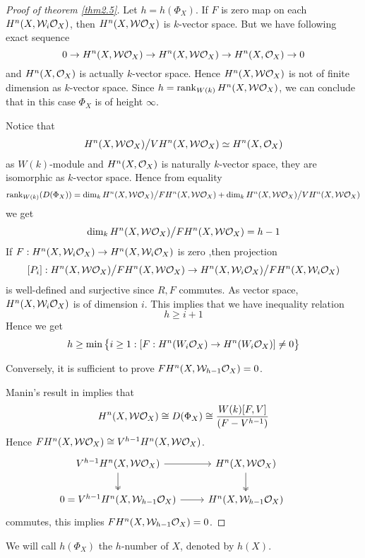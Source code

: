 \documentclass[11pt,a4paper]{scmsnotes}
\begin{document}
\begin{proof}[Proof of theorem \ref{thm2.5}]
	Let $h=h(\Phi_X)$. If $F$ is zero map on each $H^n(X,\mathcal{W}_{i} \mathcal{O}_{X})$, then $H^n(X,\mathcal{W}\mathcal{O}_{X})$ is $k$-vector space. But we have following exact sequence
	\[
	0 \to H^n(X,\mathcal{W}\mathcal{O}_{X}) \to H^n(X,\mathcal{W}\mathcal{O}_{X}) \to H^n(X,\mathcal{O}_{X}) \to 0
	\]
	and $H^n(X,\mathcal{O}_{X})$ is actually $k$-vector space. Hence $H^n(X,\mathcal{W} \mathcal{O}_{X})$ is not of finite dimension as $k$-vector space. Since $h= \operatorname{rank} _{W(k)} H^n(X,\mathcal{W}\mathcal{O}_{X})$, we can conclude that in this case $\Phi_X$ is of height $\infty$.
	
	Notice that 
	\[
	H^n(X,\mathcal{W} \mathcal{O}_{X}) \big/ VH^n(X,\mathcal{W}\mathcal{O}_{X}) \simeq H^n(X,\mathcal{O}_{X})
	\]
	as $W(k)$-module and $H^n(X,\mathcal{O}_{X})$ is naturally $k$-vector space, they are isomorphic as $k$-vector space. Hence from equality
	\[
	\operatorname{rank}_{W(k)}(D(\Phi_X)) = \dim_k H^n(X,\mathcal{W} \mathcal{O}_{X})\big/ FH^n(X,\mathcal{W} \mathcal{O}_{X}) + \dim_k H^n(X,\mathcal{W} \mathcal{O}_{X})\big/ V H^n(X,\mathcal{W} \mathcal{O}_{X})
	\]
	we get 
	\[
	\dim_k H^n(X,\mathcal{W} \mathcal{O}_{X})\big/ FH^n(X,\mathcal{W} \mathcal{O}_{X}) = h-1
	\]
	If $F:H^n(X,\mathcal{W}_i \mathcal{O}_{X}) \to H^n(X,\mathcal{W}_i \mathcal{O}_{X})$ is zero ,then projection
	\[
	[P_{i}]: H^n(X,\mathcal{W}\mathcal{O}_{X})\big/ FH^n(X,\mathcal{W} \mathcal{O}_{X}) \to H^n(X,\mathcal{W}_i \mathcal{O}_{X}) \big/FH^n(X,\mathcal{W}_i \mathcal{O}_{X})
	\]
	is well-defined and surjective since $R,F$ commutes. As vector space, $H^n(X,\mathcal{W}_i \mathcal{O}_{X})$ is of dimension $i$. This implies that we have inequality relation
	\[
	h \geq i+1
	\]
	Hence we get
	\[
	h \geq \min \big\{ i \geq 1 : [F: H^n(W_i \mathcal{O}_{X}) \to H^n(W_i \mathcal{O}_{X})] \neq 0 \big\}
	\]
	
	Conversely, it is sufficient to prove $FH^n(X,\mathcal{W}_{h-1} \mathcal{O}_{X}) =0$. 

	Manin's result in \cite{} implies that 
	\begin{equation}
		H^n(X,\mathcal{W} \mathcal{O}_{X}) \cong D(\Phi_X) \cong \frac{W(k)[F,V]}{(F - V^{h-1})} 
	\end{equation}
	Hence $FH^n(X,\mathcal{W} \mathcal{O}_{X}) \cong V^{h-1}H^n(X,\mathcal{W} \mathcal{O}_{X})$.
		\[
	\begin{tikzcd}
	V^{h-1} H^n(X,\mathcal{W} \sheaf{X}) \arrow[r] \arrow[d, two heads]& H^n(X,\mathcal{W} \sheaf{X}) \arrow[d,two heads]& \\
	0 =V^{h-1} H^n(X, \mathcal{W}_{h-1} \sheaf{X}) \arrow[r] & H^n(X,\mathcal{W}_{h-1} \sheaf{X})& 
	\end{tikzcd}
	\]
	commutes, this implies $FH^n(X ,\mathcal{W}_{h-1} \mathcal{O}_{X}) =0$. 
\end{proof}
We will call $h(\Phi_X)$ the $h$-number of $X$, denoted by $h(X)$.
\end{document}
